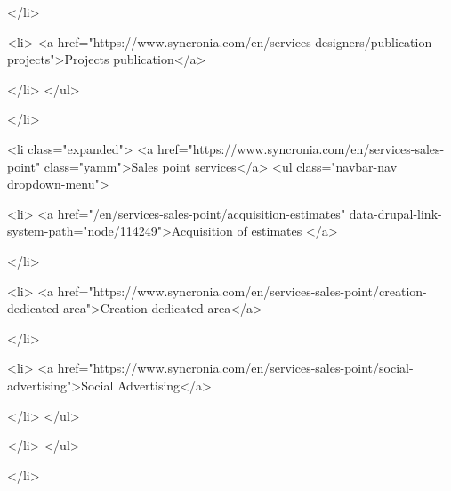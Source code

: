             </li>
        
                   
            
      
            
    

                    <li>
                  <a href="https://www.syncronia.com/en/services-designers/publication-projects">Projects publication</a>
                    
            </li>
        </ul>
  
      
            </li>
        
                   
            
      
            
    

                    <li class="expanded">
                  <a href="https://www.syncronia.com/en/services-sales-point" class="yamm">Sales point services</a>
                                          <ul class="navbar-nav dropdown-menu">
            
                   
            
      
            
    

                    <li>
                  <a href="/en/services-sales-point/acquisition-estimates" data-drupal-link-system-path="node/114249">Acquisition of estimates </a>
                    
            </li>
        
                   
            
      
            
    

                    <li>
                  <a href="https://www.syncronia.com/en/services-sales-point/creation-dedicated-area">Creation dedicated area</a>
                    
            </li>
        
                   
            
      
            
    

                    <li>
                  <a href="https://www.syncronia.com/en/services-sales-point/social-advertising">Social Advertising</a>
                    
            </li>
        </ul>
  
      
            </li>
        </ul>
  
      
            </li>
        
